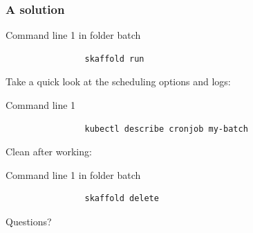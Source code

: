 	\begin{frame}[fragile]
		\frametitle{A solution}
		
		\begin{block}{Command line 1 in folder batch}
			\begin{verbatim}
				skaffold run
			\end{verbatim}
		\end{block}
		
		\bigskip
		
		Take a quick look at the scheduling options and logs:
		\begin{block}{Command line 1}
			\begin{verbatim}
				kubectl describe cronjob my-batch
			\end{verbatim}
		\end{block}
		
		\bigskip
		
		Clean after working:
		\begin{block}{Command line 1 in folder batch}
			\begin{verbatim}
				skaffold delete
			\end{verbatim}
		\end{block}
	\end{frame}
	
	\begin{frame}
		\begin{center}
			Questions?
		\end{center}
	\end{frame}